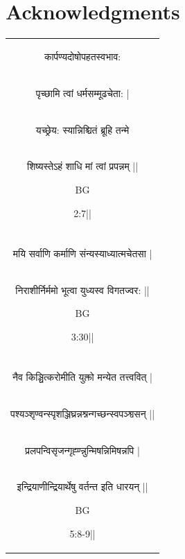 \documentclass[hidelinks,11pt,a4paper]{report}
\begin{document}
\chapter*{Acknowledgments}
\begin{table}[th]
    \centering
    \begin{tabular}{c}
\begin{sanskrit}कार्पण्यदोषोपहतस्वभाव:\end{sanskrit}\\
\begin{sanskrit}पृच्छामि त्वां धर्मसम्मूढचेता: |\end{sanskrit}\\
\begin{sanskrit}यच्छ्रेय: स्यान्निश्चितं ब्रूहि तन्मे\end{sanskrit}\\
\begin{sanskrit}शिष्यस्तेऽहं शाधि मां त्वां प्रपन्नम् ||\end{sanskrit}BG \begin{sanskrit}2:7||\end{sanskrit}\\\\
\begin{sanskrit}मयि सर्वाणि कर्माणि संन्यस्याध्यात्मचेतसा |\end{sanskrit}\\
\begin{sanskrit}निराशीर्निर्ममो भूत्वा युध्यस्व विगतज्वर: ||\end{sanskrit}BG \begin{sanskrit}3:30||\end{sanskrit}\\\\
\begin{sanskrit}
    नैव किञ्चित्करोमीति युक्तो मन्येत तत्त्ववित् |\end{sanskrit}\\
\begin{sanskrit} पश्यञ्शृण्वन्स्पृशञ्जिघ्रन्नश्नन्गच्छन्स्वपञ्श्वसन् ||\end{sanskrit}\\
\begin{sanskrit}प्रलपन्विसृजन्गृह्ण्न्नुन्मिषन्निमिषन्नपि |\end{sanskrit}\\
\begin{sanskrit}इन्द्रियाणीन्द्रियार्थेषु वर्तन्त इति धारयन् ||\end{sanskrit}BG \begin{sanskrit}5:8-9||\end{sanskrit}\\
    
\end{tabular}
\end{table}
\end{document}
